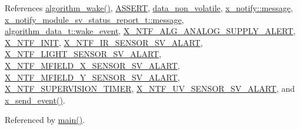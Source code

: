 References \hyperlink{a00038_source_l00670}{algorithm\+\_\+wake()}, \hyperlink{a00072_source_l00059}{A\+S\+S\+E\+R\+T}, \hyperlink{a00060_source_l00016}{data\+\_\+non\+\_\+volatile}, \hyperlink{a00036_source_l00075}{x\+\_\+notify\+::message}, \hyperlink{a00021_a13393a2d1589483b3bae4d2e79f43980}{x\+\_\+notify\+\_\+module\+\_\+sv\+\_\+status\+\_\+report\+\_\+t\+::message}, \hyperlink{a00016_source_l00079}{algorithm\+\_\+data\+\_\+t\+::wake\+\_\+event}, \hyperlink{a00021_source_l00181}{X\+\_\+\+N\+T\+F\+\_\+\+A\+L\+G\+\_\+\+A\+N\+A\+L\+O\+G\+\_\+\+S\+U\+P\+P\+L\+Y\+\_\+\+A\+L\+E\+R\+T}, \hyperlink{a00036_source_l00030}{X\+\_\+\+N\+T\+F\+\_\+\+I\+N\+I\+T}, \hyperlink{a00021_source_l00156}{X\+\_\+\+N\+T\+F\+\_\+\+I\+R\+\_\+\+S\+E\+N\+S\+O\+R\+\_\+\+S\+V\+\_\+\+A\+L\+A\+R\+T}, \hyperlink{a00021_source_l00159}{X\+\_\+\+N\+T\+F\+\_\+\+L\+I\+G\+H\+T\+\_\+\+S\+E\+N\+S\+O\+R\+\_\+\+S\+V\+\_\+\+A\+L\+A\+R\+T}, \hyperlink{a00021_source_l00162}{X\+\_\+\+N\+T\+F\+\_\+\+M\+F\+I\+E\+L\+D\+\_\+\+X\+\_\+\+S\+E\+N\+S\+O\+R\+\_\+\+S\+V\+\_\+\+A\+L\+A\+R\+T}, \hyperlink{a00021_source_l00164}{X\+\_\+\+N\+T\+F\+\_\+\+M\+F\+I\+E\+L\+D\+\_\+\+Y\+\_\+\+S\+E\+N\+S\+O\+R\+\_\+\+S\+V\+\_\+\+A\+L\+A\+R\+T}, \hyperlink{a00016_source_l00013}{X\+\_\+\+N\+T\+F\+\_\+\+S\+U\+P\+E\+R\+V\+I\+S\+I\+O\+N\+\_\+\+T\+I\+M\+E\+R}, \hyperlink{a00021_source_l00168}{X\+\_\+\+N\+T\+F\+\_\+\+U\+V\+\_\+\+S\+E\+N\+S\+O\+R\+\_\+\+S\+V\+\_\+\+A\+L\+A\+R\+T}, and \hyperlink{a00037_source_l00381}{x\+\_\+send\+\_\+event()}.



Referenced by \hyperlink{a00048_source_l00080}{main()}.


